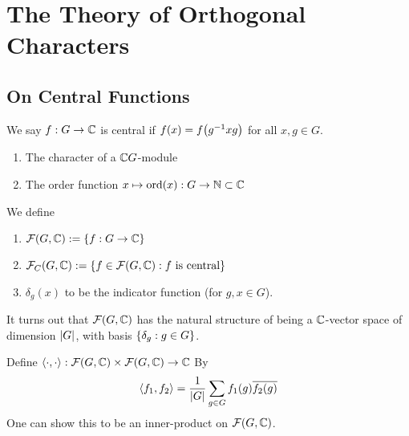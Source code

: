 \section{The Theory of Orthogonal Characters}

\subsection{On Central Functions}

\begin{boxdefinition}
    We say $f : G \to \mathbb{C}$ is central if $f\!\left( x \right) = f\!\left( g^{-1} x g \right)$ for all $x,g \in G$.
\end{boxdefinition}

\begin{boxexample}
    \hfill
    \begin{enumerate}
        \item The character of a $\mathbb{C} G$-module
        \item The order function $x \mapsto \operatorname{ord}\!\left( x \right) : G \to \mathbb{N} \subset \mathbb{C}$
    \end{enumerate}
\end{boxexample}

\begin{boxnotation}
    We define
    \begin{enumerate}
        \item $\mathcal{F}\!\left( G, \mathbb{C} \right) := \left\{ f : G \to \mathbb{C} \right\}$
        \item $\mathcal{F}_C\!\left( G, \mathbb{C} \right) := \left\{ f \in \mathcal{F}\!\left( G, \mathbb{C} \right) : f \text{ is central} \right\}$
        \item $\delta_g(x)$ to be the indicator function (for $g, x \in G$).
    \end{enumerate}
\end{boxnotation}

\begin{remark}
    It turns out that $\mathcal{F}\!\left( G, \mathbb{C} \right)$ has the natural structure of being a $\mathbb{C}$-vector space of dimension $\left\lvert G \right\rvert$, with basis $\left\{ \delta_g : g \in G \right\}$.
\end{remark}

\begin{definition}
    Define $\left\langle \cdot, \cdot \right\rangle : \mathcal{F}\!\left( G, \mathbb{C} \right) \times \mathcal{F}\!\left( G, \mathbb{C} \right) \to \mathbb{C}$ By
    \begin{align}
        \left\langle f_1, f_2 \right\rangle = \frac{1}{\left\lvert G \right\rvert} \sum_{g \in G} f_1(g) \overline{f_2(g)}
    \end{align}
    One can show this to be an inner-product on $\mathcal{F}\!\left( G, \mathbb{C} \right)$.
\end{definition}

